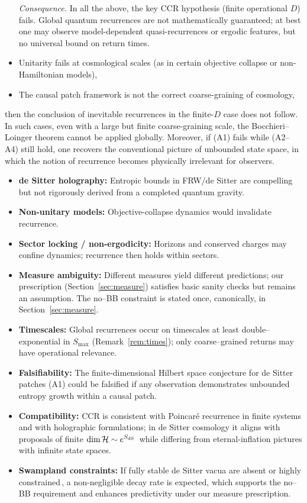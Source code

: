 \documentclass[12pt]{article}
\newcommand{\Smax}{S_{\max}}
\theoremstyle{remark}
\begin{document}
\begin{itemize}
\noindent\emph{Consequence.} In all the above, the key CCR hypothesis (finite operational $D$) fails.
Global quantum recurrences are not mathematically guaranteed; at best one may observe model-dependent
quasi-recurrences or ergodic features, but no universal bound on return times.

    
    \item Unitarity fails at cosmological scales (as in certain objective collapse or non-Hamiltonian models),
    \item The causal patch framework is not the correct coarse-graining of cosmology,
\end{itemize}
then the conclusion of inevitable recurrences in the finite-$D$ case does not follow.
In such cases, even with a large but finite coarse-graining scale, the Bocchieri–Loinger theorem cannot be applied globally.
Moreover, if (A1) fails while (A2–A4) still hold, one recovers the conventional picture of unbounded state space, in which the notion of recurrence becomes physically irrelevant for observers.


\begin{itemize}
    \item \textbf{de Sitter holography:} Entropic bounds in FRW/de Sitter are compelling but not rigorously derived from a completed quantum gravity.
    \item \textbf{Non-unitary models:} Objective-collapse dynamics would invalidate recurrence.
    \item \textbf{Sector locking / non-ergodicity:} Horizons and conserved charges may confine dynamics; recurrence then holds within sectors.
    \item \textbf{Measure ambiguity:} Different measures yield different predictions; our prescription (Section~\ref{sec:measure}) satisfies basic sanity checks but remains an assumption. The no--BB constraint is stated once, canonically, in Section~\ref{sec:measure}.
    \item \textbf{Timescales:} Global recurrences occur on timescales at least double--exponential in $\Smax$ (Remark~\ref{rem:times}); only coarse--grained returns may have operational relevance.
    \item \textbf{Falsifiability:} The finite-dimensional Hilbert space conjecture for de Sitter patches (A1) could be falsified if any observation demonstrates unbounded entropy growth within a causal patch.
    \item \textbf{Compatibility:} CCR is consistent with Poincar\'e recurrence in finite systems and with holographic formulations; in de Sitter cosmology it aligns with proposals of finite $\dim\mathcal H\sim e^{S_{\rm dS}}$\,\cite{BanksFischler2001,BanksFischler2003} while differing from eternal-inflation pictures with infinite state spaces.
    \item \textbf{Swampland constraints:} If fully stable de Sitter vacua are absent or highly constrained\,\cite{Obied2018,Ooguri2019}, a non-negligible decay rate is expected, which supports the no--BB requirement and enhances predictivity under our measure prescription.
\end{itemize}
\end{document}
